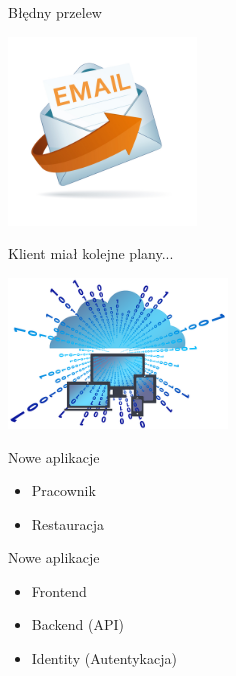 \documentclass{beamer}
\begin{document}
\begin{frame}{Błędny przelew}
	\begin{center}
		\includegraphics[height=5cm]{email2.jpg}
	\end{center}
\end{frame}

\begin{frame}{}
	\begin{center}
		\Huge{Klient miał kolejne plany...}
	\end{center}
\end{frame}

\begin{frame}{}
	\begin{center}
		\includegraphics[height=4cm]{virtual1.png}
	\end{center}
\end{frame}

\begin{frame}{Nowe aplikacje}
	\begin{huge}
		\begin{itemize}[<+->]
			\item Pracownik
			\item Restauracja
		\end{itemize}
	\end{huge}
\end{frame}

\begin{frame}{Nowe aplikacje}
	\begin{huge}
		\begin{itemize}
			\item Frontend
			\item Backend (API)
			\item Identity (Autentykacja)
		\end{itemize}
	\end{huge}
\end{frame}
\end{document}
